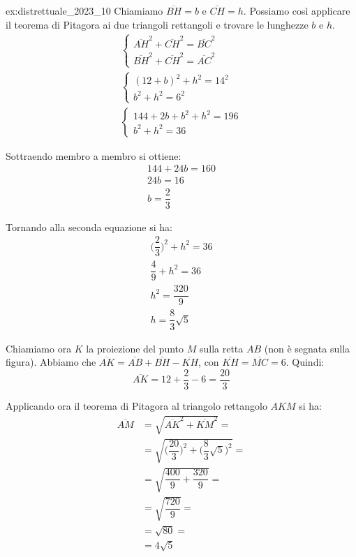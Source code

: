 \begin{soluzione}{ex:distrettuale_2023_10}
    Chiamiamo $\overline{BH} = b$ e $\overline{CH} = h$.
    Possiamo così applicare il teorema di Pitagora ai due triangoli rettangoli e trovare le lunghezze $b$ e $h$.
    \begin{gather*}
        \begin{cases}
            \overline{AH}^2 + \overline{CH}^2 = \overline{BC}^2 \\
            \overline{BH}^2 + \overline{CH}^2 = \overline{AC}^2
        \end{cases}
        \\
        \begin{cases}
            (12 + b)^2 + h^2 = 14^2 \\
            b^2 + h^2 = 6^2
        \end{cases}
        \\
        \begin{cases}
            144 + 2b + b^2 + h^2 = 196 \\
            b^2 + h^2 = 36
        \end{cases}
    \end{gather*}

    Sottraendo membro a membro si ottiene:
    \begin{gather*}
        144 + 24b = 160 \\
        24b = 16 \\
        b = \dfrac{2}{3}
    \end{gather*}
    
    Tornando alla seconda equazione si ha:
    \begin{gather*}
        \biggl(\dfrac{2}{3}\biggr)^2 + h^2 = 36 \\
        \dfrac{4}{9} + h^2 = 36 \\
        h^2 = \dfrac{320}{9} \\
        h = \dfrac{8}{3}\sqrt {5}
    \end{gather*}
    
    Chiamiamo ora $K$ la proiezione del punto $M$ sulla retta $AB$ (non è segnata sulla figura).
    Abbiamo che $\overline{AK} = \overline{AB} + \overline{BH} - \overline{KH}$, con $\overline{KH} = \overline{MC} = 6$.
    Quindi:
    \begin{equation*}
        \overline{AK} = 12 + \dfrac{2}{3} - 6 = \dfrac{20}{3}
    \end{equation*}
    
    Applicando ora il teorema di Pitagora al triangolo rettangolo $AKM$ si ha:
    \begin{align*}
        \overline{AM} &= \sqrt {\overline{AK}^2 + \overline{KM}^2} = \\
        &= \sqrt {\biggl(\dfrac{20}{3}\biggr)^2 + \biggl(\dfrac{8}{3}\sqrt {5}\biggr)^2} = \\
        &= \sqrt {\dfrac{400}{9} + \dfrac{320}{9}} = \\
        &= \sqrt {\dfrac{720}{9}} = \\
        &= \sqrt {80} = \\
        &= 4\sqrt {5}
    \end{align*}
    

\end{soluzione}